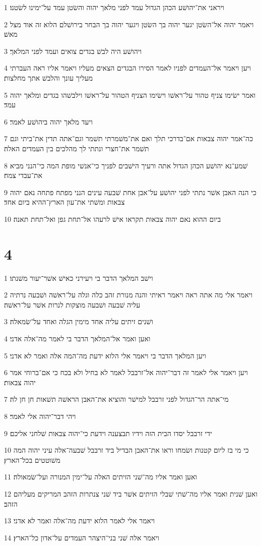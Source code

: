 \par 1 ויראני את־יהושׁע הכהן הגדול עמד לפני מלאך יהוה והשׂטן עמד על־ימינו לשׂטנו׃
\par 2 ויאמר יהוה אל־השׂטן יגער יהוה בך השׂטן ויגער יהוה בך הבחר בירושׁלם הלוא זה אוד מצל מאשׁ׃
\par 3 ויהושׁע היה לבשׁ בגדים צואים ועמד לפני המלאך׃
\par 4 ויען ויאמר אל־העמדים לפניו לאמר הסירו הבגדים הצאים מעליו ויאמר אליו ראה העברתי מעליך עונך והלבשׁ אתך מחלצות׃
\par 5 ואמר ישׂימו צניף טהור על־ראשׁו וישׂימו הצניף הטהור על־ראשׁו וילבשׁהו בגדים ומלאך יהוה עמד׃
\par 6 ויעד מלאך יהוה ביהושׁע לאמר׃
\par 7 כה־אמר יהוה צבאות אם־בדרכי תלך ואם את־משׁמרתי תשׁמר וגם־אתה תדין את־ביתי וגם תשׁמר את־חצרי ונתתי לך מהלכים בין העמדים האלה׃
\par 8 שׁמע־נא יהושׁע הכהן הגדול אתה ורעיך הישׁבים לפניך כי־אנשׁי מופת המה כי־הנני מביא את־עבדי צמח׃
\par 9 כי הנה האבן אשׁר נתתי לפני יהושׁע על־אבן אחת שׁבעה עינים הנני מפתח פתחה נאם יהוה צבאות ומשׁתי את־עון הארץ־ההיא ביום אחד׃
\par 10 ביום ההוא נאם יהוה צבאות תקראו אישׁ לרעהו אל־תחת גפן ואל־תחת תאנה׃

\chapter{4}

\par 1 וישׁב המלאך הדבר בי ויעירני כאישׁ אשׁר־יעור משׁנתו׃
\par 2 ויאמר אלי מה אתה ראה ויאמר ראיתי והנה מנורת זהב כלה וגלה על־ראשׁה ושׁבעה נרתיה עליה שׁבעה ושׁבעה מוצקות לנרות אשׁר על־ראשׁה׃
\par 3 ושׁנים זיתים עליה אחד מימין הגלה ואחד על־שׂמאלה׃
\par 4 ואען ואמר אל־המלאך הדבר בי לאמר מה־אלה אדני׃
\par 5 ויען המלאך הדבר בי ויאמר אלי הלוא ידעת מה־המה אלה ואמר לא אדני׃
\par 6 ויען ויאמר אלי לאמר זה דבר־יהוה אל־זרבבל לאמר לא בחיל ולא בכח כי אם־ברוחי אמר יהוה צבאות׃
\par 7 מי־אתה הר־הגדול לפני זרבבל למישׁר והוציא את־האבן הראשׁה תשׁאות חן חן לה׃
\par 8 ויהי דבר־יהוה אלי לאמר׃
\par 9 ידי זרבבל יסדו הבית הזה וידיו תבצענה וידעת כי־יהוה צבאות שׁלחני אליכם׃
\par 10 כי מי בז ליום קטנות ושׂמחו וראו את־האבן הבדיל ביד זרבבל שׁבעה־אלה עיני יהוה המה משׁוטטים בכל־הארץ׃
\par 11 ואען ואמר אליו מה־שׁני הזיתים האלה על־ימין המנורה ועל־שׂמאולה׃
\par 12 ואען שׁנית ואמר אליו מה־שׁתי שׁבלי הזיתים אשׁר ביד שׁני צנתרות הזהב המריקים מעליהם הזהב׃
\par 13 ויאמר אלי לאמר הלוא ידעת מה־אלה ואמר לא אדני׃
\par 14 ויאמר אלה שׁני בני־היצהר העמדים על־אדון כל־הארץ׃

